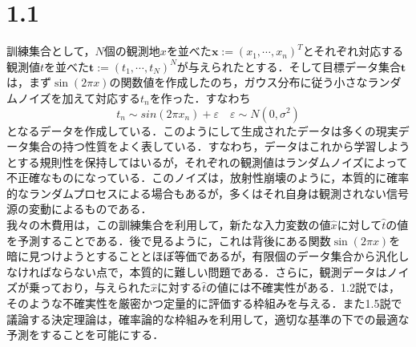 \documentclass{jsarticle}
\theoremstyle{definition}
\begin{document}
\large

\section*{1.1}訓練集合として，$N$個の観測地$x$を並べた${\bm x}:=(x_1,\cdots,x_n)^T $とそれぞれ対応する観測値$t$を並べた${\bm t}:= (t_1,\cdots,t_N)^N$が与えられたとする．そして目標データ集合${\bm t}$は，まず$\sin(2\pi x)$の関数値を作成したのち，ガウス分布に従う小さなランダムノイズを加えて対応する$t_n$を作った．すなわち
$$t_n \sim sin(2\pi x_n) + \varepsilon \quad \varepsilon \sim N(0,\sigma^2)$$
となるデータを作成している．このようにして生成されたデータは多くの現実データ集合の持つ性質をよく表している．すなわち，データはこれから学習しようとする規則性を保持してはいるが，それぞれの観測値はランダムノイズによって不正確なものになっている．このノイズは，放射性崩壊のように，本質的に確率的なランダムプロセスによる場合もあるが，多くはそれ自身は観測されない信号源の変動によるものである．\\

我々の木費用は，この訓練集合を利用して，新たな入力変数の値$\hat{x}$に対して$\hat{t}$の値を予測することである．後で見るように，これは背後にある関数$\sin (2\pi x)$を暗に見つけようとすることとほぼ等価であるが，有限個のデータ集合から汎化しなければならない点で，本質的に難しい問題である．さらに，観測データはノイズが乗っており，与えられた$\hat{x}$に対する$\hat t$の値には不確実性がある．1.2説では，そのような不確実性を厳密かつ定量的に評価する枠組みを与える．また1.5説で議論する決定理論は，確率論的な枠組みを利用して，適切な基準の下での最適な予測をすることを可能にする．\\
\end{document}
